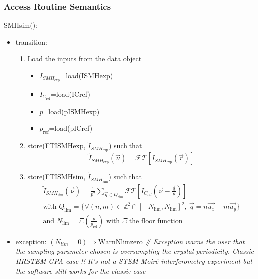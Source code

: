 \documentclass[12pt, titlepage]{article}
\begin{document}
\subsubsection{Access Routine Semantics}

\noindent SMHsim():
\begin{itemize} 
\item transition:
	\begin{enumerate}
	\item Load the inputs from the data object
	\begin{itemize}
	\item $I_{\mathit{SMH}_{\text{exp}}}$=load(ISMHexp)
	\item $I_{C_{\text{ref}}}$=load(ICref)
	\item $p$=load(pISMHexp)
	\item $p_{\text{ref}}$=load(pICref)
	\end{itemize}
	\item store(FTISMHexp, $\widetilde{I}_{\mathit{SMH}_{\text{exp}}}$) such that
	\begin{equation*}
\widetilde{I}_{\mathit{SMH}_{\text{exp}}}(\vec{\nu})=\mathcal{FT}[I_{\mathit{SMH}_{\text{exp}}}(\vec{r})]
	\end{equation*}
	\item store(FTISMHsim, $\widetilde{I}_{\mathit{SMH}_{\text{sim}}}$) such that
	\begin{equation*}
	\begin{gathered}
\widetilde{I}_{\mathit{SMH}_{\text{sim}}}(\vec{\nu})=\frac{1}{p^2}\sum_{\vec{q}\in 
Q_{lim}}\mathcal{FT}[I_{C_{\text{ref}}}(\vec{\nu}-\frac{\vec{q}}{p})] \\
	\text{with } Q_{\text{lim}}=\{\forall (n,m) \in 
\mathbb{Z}^{2}\cap[-N_{\text{lim}},N_{\text{lim}}]^2, \ 
\vec{q}=n\vec{u_x}+m\vec{u_y}\} \\
	\text{and } N_{\text{lim}}=\Xi(\frac{p}{p_{\text{ref}}}) \text{ with } \Xi 
\text{ the floor function } 
	\end{gathered}
	\end{equation*}
	\end{enumerate}

\item exception:
\newline
$(N_{lim}=0) \Rightarrow \text{WarnNlimzero}$
\textit{{\#} Exception warns the user that the sampling parameter chosen is 
oversampling the crystal periodicity. Classic HRSTEM GPA case !! It's not a STEM 
Moir{\'e} interferometry experiment but the software still works for the classic 
case}

\end{itemize}
\end{document}

